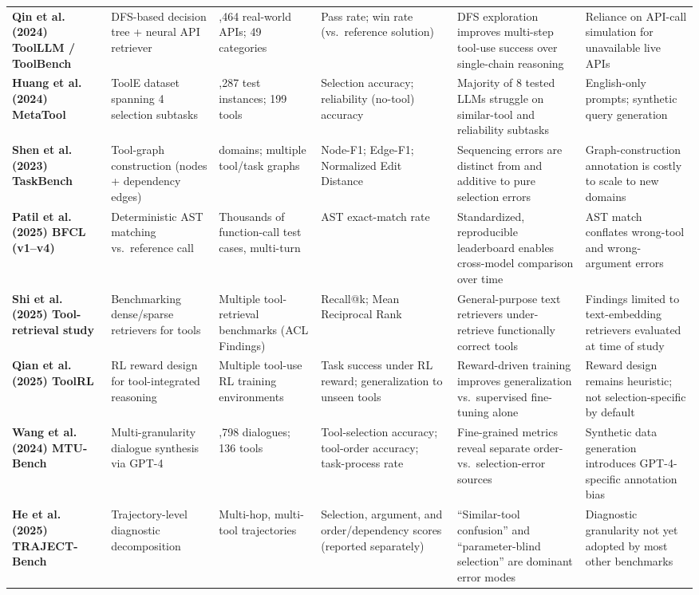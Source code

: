 \documentclass[acmsmall]{acmart}
\begin{document}
\begin{table}[!t]
\begin{tabularx}{\textwidth}{@{}>{\raggedright\arraybackslash}X>{\raggedright\arraybackslash}X>{\raggedright\arraybackslash}X>{\raggedright\arraybackslash}X>{\raggedright\arraybackslash}X>{\raggedright\arraybackslash}X@{}}
    \textbf{Qin et al. (2024) ToolLLM / ToolBench} & DFS-based decision tree + neural API retriever & 16,464 real-world APIs; 49 categories & Pass rate; win rate (vs.\ reference solution) & DFS exploration improves multi-step tool-use success over single-chain reasoning & Reliance on API-call simulation for unavailable live APIs \\
    \textbf{Huang et al. (2024) MetaTool} & ToolE dataset spanning 4 selection subtasks & 4,287 test instances; 199 tools & Selection accuracy; reliability (no-tool) accuracy & Majority of 8 tested LLMs struggle on similar-tool and reliability subtasks & English-only prompts; synthetic query generation \\
    \textbf{Shen et al. (2023) TaskBench} & Tool-graph construction (nodes + dependency edges) & 3 domains; multiple tool/task graphs & Node-F1; Edge-F1; Normalized Edit Distance & Sequencing errors are distinct from and additive to pure selection errors & Graph-construction annotation is costly to scale to new domains \\
    \textbf{Patil et al. (2025) BFCL (v1--v4)} & Deterministic AST matching vs.\ reference call & Thousands of function-call test cases, multi-turn & AST exact-match rate & Standardized, reproducible leaderboard enables cross-model comparison over time & AST match conflates wrong-tool and wrong-argument errors \\
    \textbf{Shi et al. (2025) Tool-retrieval study} & Benchmarking dense/sparse retrievers for tools & Multiple tool-retrieval benchmarks (ACL Findings) & Recall@k; Mean Reciprocal Rank & General-purpose text retrievers under-retrieve functionally correct tools & Findings limited to text-embedding retrievers evaluated at time of study \\
    \textbf{Qian et al. (2025) ToolRL} & RL reward design for tool-integrated reasoning & Multiple tool-use RL training environments & Task success under RL reward; generalization to unseen tools & Reward-driven training improves generalization vs.\ supervised fine-tuning alone & Reward design remains heuristic; not selection-specific by default \\
    \textbf{Wang et al. (2024) MTU-Bench} & Multi-granularity dialogue synthesis via GPT-4 & 54,798 dialogues; 136 tools & Tool-selection accuracy; tool-order accuracy; task-process rate & Fine-grained metrics reveal separate order- vs.\ selection-error sources & Synthetic data generation introduces GPT-4-specific annotation bias \\
    \textbf{He et al. (2025) TRAJECT-Bench} & Trajectory-level diagnostic decomposition & Multi-hop, multi-tool trajectories & Selection, argument, and order/dependency scores (reported separately) & ``Similar-tool confusion'' and ``parameter-blind selection'' are dominant error modes & Diagnostic granularity not yet adopted by most other benchmarks \\
    \bottomrule
  \end{tabularx}


\end{table}
\end{document}
